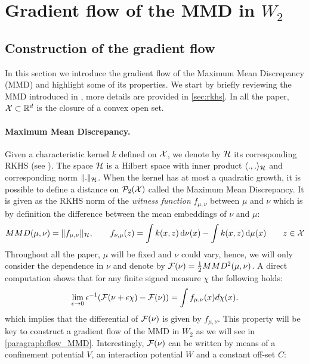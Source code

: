 
\section{Gradient flow of the MMD in $W_2$}\label{sec:gradient_flow}
\subsection{Construction of the gradient flow}
In this section we introduce the gradient flow of the Maximum Mean Discrepancy (MMD) and highlight some of its properties. We start by briefly reviewing the MMD introduced in \cite{gretton2012kernel}, more details are provided in \cref{sec:rkhs}. In all the paper, ${{\mathcal X}}\subset{{\mathbb R}}^d$ is the closure of a convex open set.
\paragraph{Maximum Mean Discrepancy.}\label{subsec:MMD}
Given a characteristic kernel $k$ defined on ${{\mathcal X}}$, we denote by ${{\mathcal H}}$ its corresponding RKHS (see \cite{smola1998learning}). The space ${{\mathcal H}}$ is a Hilbert space with inner product $\langle .,. \rangle_{{{\mathcal H}}}$ and corresponding norm $\Vert . \Vert_{{{\mathcal H}}}$.
When the kernel has at most a quadratic growth, it is possible to define a distance on $\mathcal{P}_2({{\mathcal X}})$ called the Maximum Mean Discrepancy. It is given as the RKHS norm of the \textit{witness function} $f_{\mu,\nu}$ between $\mu$ and $\nu$ which is by definition the difference between the mean embeddings of $\nu$ and $\mu$: 
\begin{align}\label{eq:witness_function}
MMD(\mu,\nu) = \Vert f_{\mu,\nu} \Vert_{{{\mathcal H}}}, \qquad f_{\nu,\mu}(z) = \int k(x,z)\mathop{}\!\mathrm{d} \nu(x) - \int k(x,z)\mathop{}\!\mathrm{d} \mu(x)  \qquad z\in {{\mathcal X}}
\end{align}
Throughout all the paper, $\mu$ will be fixed and $\nu$ could vary, hence, we will only consider the dependence in $\nu$ and denote by ${{\mathcal F}}(\nu)= \frac{1}{2}MMD^2(\mu,\nu)$. 
A direct computation shows that for any finite signed measure $\chi$ the following holds:
\begin{align}\label{prop:differential_mmd}
		\lim_{\epsilon\rightarrow 0} \epsilon^{-1}({{\mathcal F}}(\nu +\epsilon\chi) - {{\mathcal F}}(\nu)) = \int f_{\mu,\nu}(x)d\chi(x).
	\end{align}
which implies that the differential of ${{\mathcal F}}(\nu)$ is given by $f_{\mu,\nu}$. This property will be key to construct a gradient flow of the MMD in $W_2$ as we will see in \cref{paragraph:flow_MMD}.
 Interestingly, ${{\mathcal F}}(\nu)$ can be written by means of a confinement potential $V$, an interaction potential $W$ and a constant off-set $C$:
